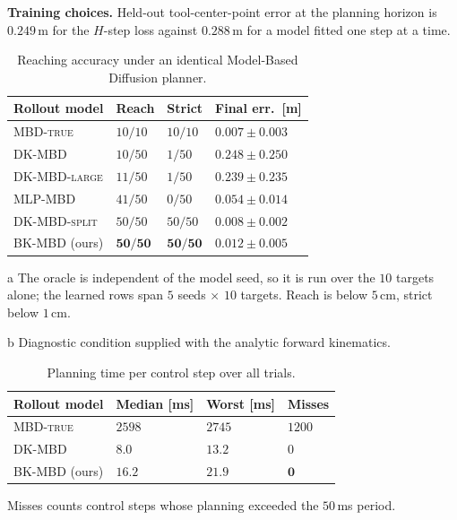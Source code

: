 \documentclass[letterpaper,10pt,conference]{ieeeconf}
\newcommand{\mbdtrue}{\textsc{MBD-true}}
\newcommand{\dkmbd}{\textsc{DK-MBD}}
\newcommand{\dksplit}{\textsc{DK-MBD-split}}
\newcommand{\bkmbd}{\textsc{BK-MBD}}
\begin{document}
\textbf{Training choices.}
Held-out tool-center-point error at the planning horizon is $0.249$\,m for the $H$-step loss against $0.288$\,m for a model fitted one step at a time.

\begin{table}[t]
\centering
\begin{threeparttable}
\caption{Reaching accuracy under an identical Model-Based Diffusion planner.}
\label{tab:franka}
\footnotesize
\setlength{\tabcolsep}{4pt}
\begin{tabularx}{\linewidth}{l Y Y Y}
\toprule
Rollout model & Reach & Strict & Final err.\ [m] \\
\midrule
\mbdtrue{} & $10/10$ & $10/10$ & $0.007{\pm}0.003$ \\
\dkmbd{} & $10/50$ & $1/50$ & $0.248{\pm}0.250$ \\
\textsc{DK-MBD-large} & $11/50$ & $1/50$ & $0.239{\pm}0.235$ \\
\textsc{MLP-MBD} & $41/50$ & $0/50$ & $0.054{\pm}0.014$ \\
\dksplit{} & $50/50$ & $50/50$ & $0.008{\pm}0.002$ \\
\bkmbd{} (ours) & $\mathbf{50/50}$ & $\mathbf{50/50}$ & $\mathbf{0.012{\pm}0.005}$ \\
\bottomrule
\end{tabularx}
\begin{tablenotes}[flushleft]\scriptsize
\item[a] The oracle is independent of the model seed, so it is run over the
$10$ targets alone; the learned rows span $5$ seeds $\times$ $10$ targets.
Reach is below $5$\,cm, strict below $1$\,cm.
\item[b] Diagnostic condition supplied with the analytic forward kinematics.
\end{tablenotes}
\end{threeparttable}
\end{table}

\begin{table}[t]
\centering
\begin{threeparttable}
\caption{Planning time per control step over all trials.}
\label{tab:latency}
\footnotesize
\begin{tabularx}{\linewidth}{l Y Y Y}
\toprule
Rollout model & Median [ms] & Worst [ms] & Misses \\
\midrule
\mbdtrue{} & $2598$ & $2745$ & $1200$ \\
\dkmbd{} & $8.0$ & $13.2$ & $0$ \\
\bkmbd{} (ours) & $\mathbf{16.2}$ & $\mathbf{21.9}$ & $\mathbf{0}$ \\
\bottomrule
\end{tabularx}
\begin{tablenotes}[flushleft]\scriptsize
\item Misses counts control steps whose planning exceeded the $50$\,ms period.
\end{tablenotes}
\end{threeparttable}
\end{table}
\end{document}
